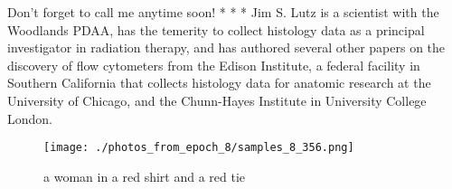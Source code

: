 \documentclass{article}%
\begin{document}
Don’t forget to call me anytime soon!\newline%
* * *\newline%
Jim S. Lutz is a scientist with the Woodlands PDAA, has the temerity to collect histology data as a principal investigator in radiation therapy, and has authored several other papers on the discovery of flow cytometers from the Edison Institute, a federal facility in Southern California that collects histology data for anatomic research at the University of Chicago, and the Chunn{-}Hayes Institute in University College London.\newline%

%


\begin{figure}[h!]%
\centering%
\texttt{[image: ./photos\_from\_epoch\_8/samples\_8\_356.png]}%
\caption{a woman in a red shirt and a red tie}%
\end{figure}

%
\end{document}
